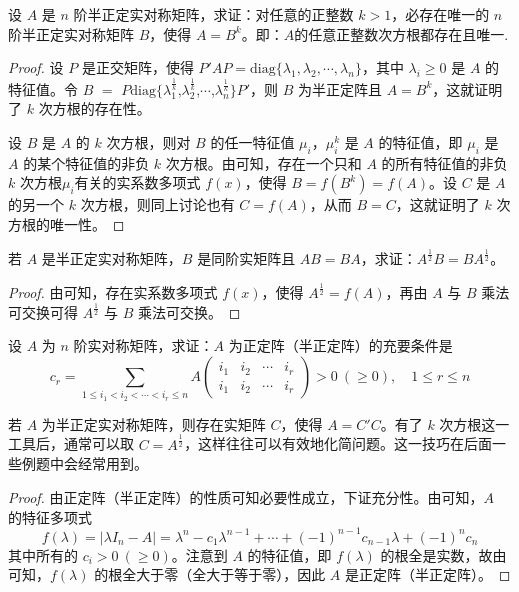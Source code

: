 \documentclass[../../main.tex]{subfiles}%
\begin{document}
\begin{proposition}\label{proposition:例9.61}
设 \(A\) 是 \(n\) 阶半正定实对称矩阵，求证：对任意的正整数 \(k > 1\)，必存在唯一的 \(n\) 阶半正定实对称矩阵 \(B\)，使得 \(A = B^k\)。即：$A$的任意正整数次方根都存在且唯一.
\end{proposition}
\begin{proof}
设 \(P\) 是正交矩阵，使得 \(P'AP = \mathrm{diag}\{\lambda_1,\lambda_2,\cdots,\lambda_n\}\)，其中 \(\lambda_i \geqslant  0\) 是 \(A\) 的特征值。令 $B$ $=$ $P$$\mathrm{diag}$$\{$$\lambda_1^{\frac{1}{k}}$,$\lambda_2^{\frac{1}{k}}$,$\cdots$,$\lambda_n^{\frac{1}{k}}$$\}$$P'$，则 \(B\) 为半正定阵且 \(A = B^k\)，这就证明了 \(k\) 次方根的存在性。

设 \(B\) 是 \(A\) 的 \(k\) 次方根，则对 \(B\) 的任一特征值 \(\mu_i\)，\(\mu_i^k\) 是 \(A\) 的特征值，即 \(\mu_i\) 是 \(A\) 的某个特征值的非负 \(k\) 次方根。由可知，存在一个只和 \(A\) 的所有特征值的非负 \(k\) 次方根$\mu_i$有关的实系数多项式 \(f(x)\)，使得 \(B = f(B^k) = f(A)\)。设 \(C\) 是 \(A\) 的另一个 \(k\) 次方根，则同上讨论也有 \(C = f(A)\)，从而 \(B = C\)，这就证明了 \(k\) 次方根的唯一性。 
\end{proof}

\begin{proposition}\label{proposition:例9.62}
若 \(A\) 是半正定实对称矩阵，\(B\) 是同阶实矩阵且 \(AB = BA\)，求证：\(A^{\frac{1}{2}}B = BA^{\frac{1}{2}}\)。
\end{proposition}
\begin{proof}
由可知，存在实系数多项式 \(f(x)\)，使得 \(A^{\frac{1}{2}} = f(A)\)，再由 \(A\) 与 \(B\) 乘法可交换可得 \(A^{\frac{1}{2}}\) 与 \(B\) 乘法可交换。
\end{proof}

\begin{proposition}\label{proposition:例9.63}
设 \(A\) 为 \(n\) 阶实对称矩阵，求证：\(A\) 为正定阵（半正定阵）的充要条件是
\[
c_r = \sum_{1\leqslant  i_1 < i_2 < \cdots < i_r \leqslant  n}A\begin{pmatrix}
i_1 & i_2 & \cdots & i_r \\
i_1 & i_2 & \cdots & i_r
\end{pmatrix} > 0\ (\geqslant  0),\quad 1\leqslant  r \leqslant  n
\]
\end{proposition}
\begin{remark}
若 \(A\) 为半正定实对称矩阵，则存在实矩阵 \(C\)，使得 \(A = C'C\)。有了 \(k\) 次方根这一工具后，通常可以取 \(C = A^{\frac{1}{2}}\)，这样往往可以有效地化简问题。这一技巧在后面一些例题中会经常用到。 
\end{remark}
\begin{proof}
由正定阵（半正定阵）的性质可知必要性成立，下证充分性。由可知，\(A\) 的特征多项式
\[
f(\lambda) = |\lambda I_n - A| = \lambda^n - c_1\lambda^{n - 1} + \cdots + (-1)^{n - 1}c_{n - 1}\lambda + (-1)^nc_n
\]
其中所有的 \(c_i > 0\ (\geqslant  0)\)。注意到 \(A\) 的特征值，即 \(f(\lambda)\) 的根全是实数，故由可知，\(f(\lambda)\) 的根全大于零（全大于等于零），因此 \(A\) 是正定阵（半正定阵）。
\end{proof}
\end{document}
